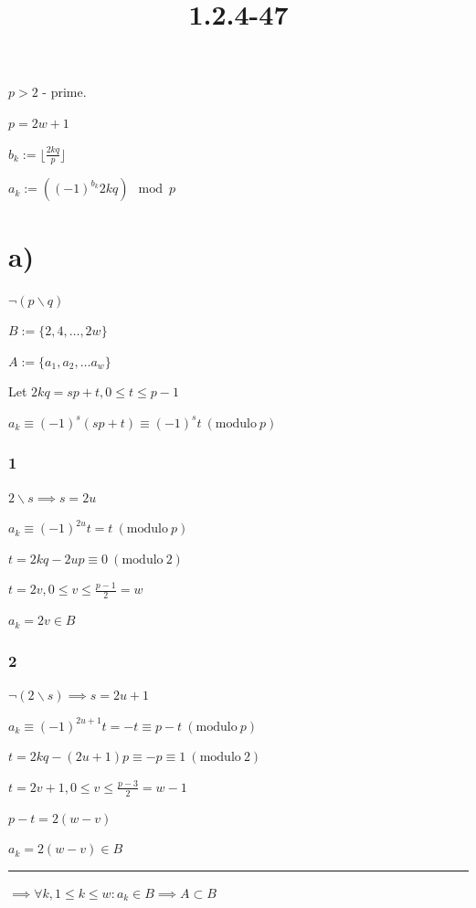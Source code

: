 \documentclass{article}
\title{1.2.4-47}
\begin{document}
\maketitle

$p > 2$ - prime.

$p = 2 w + 1$

$b_k := \lfloor{\frac{2kq}{p}}\rfloor$

$a_k := ((-1)^{b_k} 2kq) \mod p$

\section*{a)}

$\lnot(p \backslash q)$

$B := \{ 2, 4, \ldots, 2w \}$

$A := \{ a_1, a_2, \ldots a_w \}$

Let $2kq = sp + t, 0 \leq t \leq p - 1$

$a_k \equiv (-1)^s(sp+t) \equiv (-1)^s t \ (\mathrm{modulo}\ p)$

\subsubsection*{1}

$2 \backslash s \implies s = 2u$

$a_k \equiv (-1)^{2u} t = t \ (\mathrm{modulo}\ p)$

$t = 2kq - 2up \equiv 0 \ (\mathrm{modulo}\ 2)$

$t = 2v, 0 \leq v \leq \frac{p-1}{2} = w$

$a_k = 2v \in B$

\subsubsection*{2}

$\lnot(2 \backslash s) \implies s = 2u + 1$

$a_k \equiv (-1)^{2u+1} t = -t \equiv p - t \ (\mathrm{modulo}\ p)$

$t = 2kq - (2u+1)p \equiv -p \equiv 1 \ (\mathrm{modulo}\ 2)$

$t = 2v + 1, 0 \leq v \leq \frac{p-3}{2} = w - 1$

$p - t = 2 (w - v)$

$a_k = 2(w-v) \in B$

\bigskip\hrule\bigskip

$\implies \forall k, 1 \leq k \leq w: a_k \in B \implies A \subset B$
\end{document}
